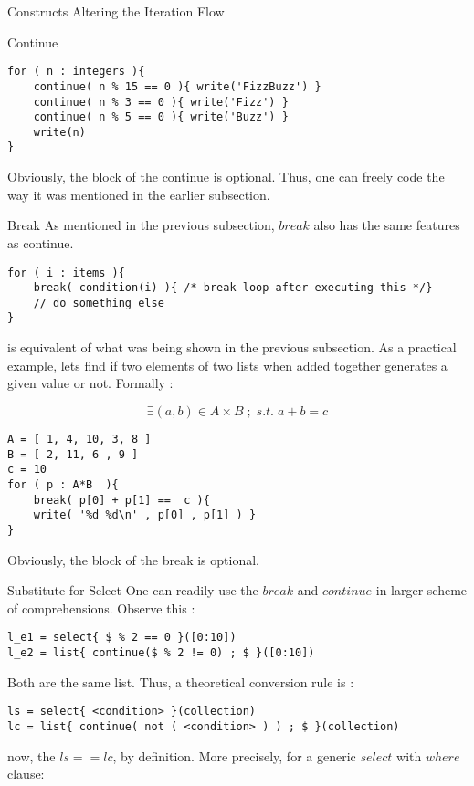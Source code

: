 \begin{section}{Constructs Altering the Iteration Flow}
\begin{subsection}{Continue}
\begin{lstlisting}[style=JexlStyle]
for ( n : integers ){
    continue( n % 15 == 0 ){ write('FizzBuzz') }
    continue( n % 3 == 0 ){ write('Fizz') }
    continue( n % 5 == 0 ){ write('Buzz') }
    write(n) 
}
\end{lstlisting}
Obviously, the block of the continue is optional.
Thus, one can freely code the way it was mentioned in the 
earlier subsection.
\end{subsection}


\begin{subsection}{Break}
As mentioned in the previous subsection, 
$break$ also has the same features as continue. 

\begin{lstlisting}[style=JexlStyle]
for ( i : items ){
    break( condition(i) ){ /* break loop after executing this */} 
    // do something else 
}
\end{lstlisting}
is equivalent of what was being shown in the previous subsection.
As a practical example, lets find if two elements of two lists
when added together generates a given value or not.
Formally :

$$
\exists (a,b) \in A \times B \; ; \; s.t. \; a + b = c  
$$

\begin{lstlisting}[style=JexlStyle]
A = [ 1, 4, 10, 3, 8 ]
B = [ 2, 11, 6 , 9 ]
c = 10 
for ( p : A*B  ){
    break( p[0] + p[1] ==  c ){ 
    write( '%d %d\n' , p[0] , p[1] ) } 
}
\end{lstlisting}
Obviously, the block of the break is optional.
\end{subsection}

\begin{subsection}{Substitute for Select}
One can readily use the $break$ and $continue$ in larger scheme of comprehensions.
Observe this :

\begin{lstlisting}[style=JexlStyle]
l_e1 = select{ $ % 2 == 0 }([0:10])
l_e2 = list{ continue($ % 2 != 0) ; $ }([0:10])
\end{lstlisting}
Both are the same list. Thus, a theoretical conversion rule is :

\begin{lstlisting}[style=JexlStyle]
ls = select{ <condition> }(collection)
lc = list{ continue( not ( <condition> ) ) ; $ }(collection)
\end{lstlisting}
now, the $ls == lc$, by definition.
More precisely, for a generic $select$ with $where$ clause:


\end{subsection}
\end{section}
